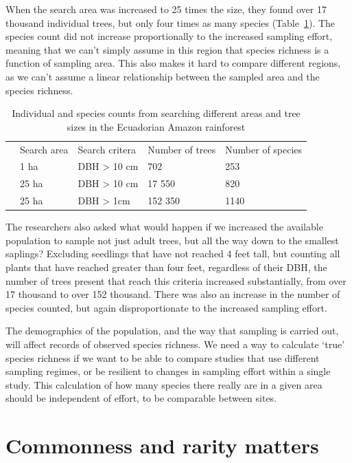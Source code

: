 \documentclass[
  letterpaper,
  DIV=11,
  numbers=noendperiod]{scrreprt}
\begin{document}
When the search area was increased to 25 times the size, they found over
17 thousand individual trees, but only four times as many species
(Table~\ref{tbl-amazon-rainforest-species}). The species count did not
increase proportionally to the increased sampling effort, meaning that
we can't simply assume in this region that species richness is a
function of sampling area. This also makes it hard to compare different
regions, as we can't assume a linear relationship between the sampled
area and the species richness.

\begin{longtable}[t]{lllll}

\caption{\label{tbl-amazon-rainforest-species}Individual and species
counts from searching different areas and tree sizes in the Ecuadorian
Amazon rainforest}

\tabularnewline

\\
\toprule
 & Search area & Search critera & Number of trees & Number of species\\
\midrule
 & 1 ha & DBH > 10 cm & 702 & 253\\
 & 25 ha & DBH > 10 cm & 17 550 & 820\\
 & 25 ha & DBH > 1cm & 152 350 & 1140\\
\bottomrule

\end{longtable}

The researchers also asked what would happen if we increased the
available population to sample not just adult trees, but all the way
down to the smallest saplings? Excluding seedlings that have not reached
4 feet tall, but counting all plants that have reached greater than four
feet, regardless of their DBH, the number of trees present that reach
this criteria increased substantially, from over 17 thousand to over 152
thousand. There was also an increase in the number of species counted,
but again disproportionate to the increased sampling effort.

The demographics of the population, and the way that sampling is carried
out, will affect records of observed species richness. We need a way to
calculate `true' species richness if we want to be able to compare
studies that use different sampling regimes, or be resilient to changes
in sampling effort within a single study. This calculation of how many
species there really are in a given area should be independent of
effort, to be comparable between sites.

\chapter{Commonness and rarity matters}\label{sec-commonness-and-rarity}
\end{document}
